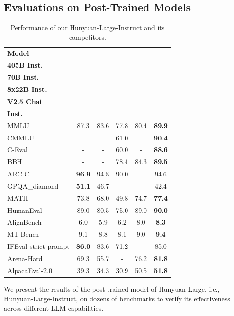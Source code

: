 \documentclass{article}
\begin{document}
\subsection{Evaluations on Post-Trained Models}
\label{sec:post_eval}
\begin{table}[!hbtp]
	\centering
        \caption{Performance of our Hunyuan-Large-Instruct and its competitors. }
		\begin{tabular}{lccccc}
			\toprule
			\textbf{Model} & \makecell[c]{\textbf{LLama3.1}\\\textbf{405B Inst.}} & \makecell[c]{\textbf{LLama3.1}\\\textbf{70B Inst.}} & \makecell[c]{\textbf{Mixtral}\\ \textbf{8x22B Inst.}} & \makecell[c]{\textbf{DeepSeek}\\\textbf{V2.5 Chat}} & \makecell[c]{\textbf{Hunyuan-Large}\\\textbf{Inst.}} \\
        \midrule
MMLU                 & 87.3          & 83.6 & 77.8 & 80.4          & \textbf{89.9} \\
CMMLU                & -             & -    & 61.0 & -          & \textbf{90.4} \\
C-Eval               & -             & -    & 60.0 & -          & \textbf{88.6} \\
BBH                  & -             & -    & 78.4 & 84.3 & \textbf{89.5}          \\
ARC-C                & \textbf{96.9} & 94.8 & 90.0 & -          & 94.6          \\
GPQA\_diamond        & \textbf{51.1} & 46.7 & - & -          & 42.4          \\
MATH                 & 73.8          & 68.0 & 49.8 & 74.7          & \textbf{77.4} \\
HumanEval            & 89.0 & 80.5 & 75.0 & 89.0          & \textbf{90.0}         \\
\midrule
AlignBench           & 6.0             & 5.9    & 6.2  & 8.0             & \textbf{8.3}  \\
MT-Bench             & 9.1             & 8.8    & 8.1  & 9.0          & \textbf{9.4}  \\
IFEval strict-prompt & \textbf{86.0}             & 83.6    & 71.2 & -             & 85.0 \\
Arena-Hard & 69.3             & 55.7    & - & 76.2             & \textbf{81.8} \\
AlpacaEval-2.0 &  39.3 & 34.3 & 30.9 & 50.5 & \textbf{51.8}\\
        \bottomrule
	\end{tabular}
	\label{tab:main_post_train}
\end{table}
We present the results of the post-trained model of Hunyuan-Large, i.e., Hunyuan-Large-Instruct, on dozens of benchmarks to verify its effectiveness across different LLM capabilities.
\end{document}
